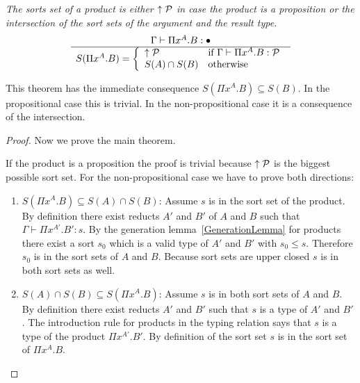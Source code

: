 \begin{theorem}
    \label{thm:SortSetProduct}
    \emph{The sorts set of a product is either ${\uparrow {\cal P}}$ in case the product
    is a proposition or the intersection of the sort sets of the argument and
    the result type.}
    $$
    \ruleh{
        \Gamma \vdash \Pi x^A. B : \dontcare
    }
    {
        S(\Pi x^A. B) =
        \dcases{
            \upper\Prop & \text{if }\Gamma \vdash \Pi x^A . B : \Prop
            \\
            S(A) \cap S(B) & \text{otherwise}
        }
    }
    $$

    This theorem has the immediate consequence $S(\Pi x^A. B) \subseteq S(B)$. In
    the propositional case this is trivial. In the non-propositional case it is
    a consequence of the intersection.

    \begin{proof}
        Now we prove the main theorem.

        If the product is a proposition the proof is trivial because
        ${\uparrow {\cal P}}$ is the biggest possible sort set. For the
        non-propositional case we have to prove both directions:
        \begin{enumerate}
            \item $S(\Pi x^A. B) \subseteq S(A) \cap S(B)$:
                Assume $s$ is in the sort set of the product. By definition
                there exist reducts $A'$ and $B'$ of $A$ and $B$ such that
                $\Gamma \vdash \Pi x^{A'}. B' : s$. By the generation
                lemma~\ref{GenerationLemma} for products there exist a sort
                $s_0$ which is a valid type of $A'$ and $B'$ with $s_0 \le s$.
                Therefore $s_0$ is in the sort sets of $A$ and $B$. Because sort
                sets are upper closed $s$ is in both sort sets as well.

            \item $S(A) \cap S(B) \subseteq S(\Pi x^A. B)$:
                Assume $s$ is in both sort sets of $A$ and $B$. By definition
                there exist reducts $A'$ and $B'$ such that $s$ is a type of
                $A'$ and $B'$. The introduction rule for products in the typing
                relation says that $s$ is a type of the product $\Pi x^{A'}.
                B'$. By definition of the sort set $s$ is in the sort set of
                $\Pi x^A. B$.
        \end{enumerate}
    \end{proof}
\end{theorem}






